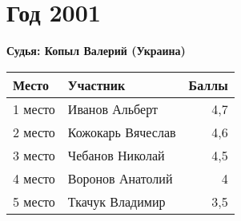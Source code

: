 \chapter{Год 2001}
\textbf{Судья: Копыл Валерий (Украина)}

\begin{tabularx}{\textwidth}{l l r}
Место & Участник & Баллы \\
\hline
1 место & Иванов Альберт & 4,7 \\
2 место & Кожокарь Вячеслав & 4,6 \\
3 место & Чебанов Николай & 4,5 \\
4 место & Воронов Анатолий & 4 \\
5 место & Ткачук Владимир & 3,5 \\
\end{tabularx}
